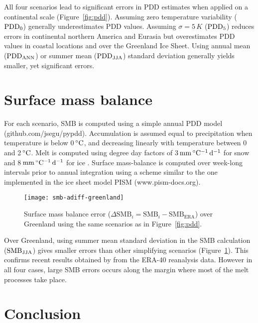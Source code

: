 \documentclass[twocolumn]{igs}
\begin{document}
All four scenarios lead to significant errors in PDD estimates when applied on a continental scale (Figure~\ref{fig:pdd}). Assuming zero temperature variability ($\rm PDD_0$) generally underestimates PDD values. Assuming $\sigma=5\,K$ ($\rm PDD_5$) reduces errors in continental northern America and Eurasia but overestimates PDD values in coastal locations and over the Greenland Ice Sheet. Using annual mean ($\rm PDD_{ANN}$) or summer mean ($\rm PDD_{JJA}$) standard deviation generally yields smaller, yet significant errors.


\section{Surface mass balance}

For each scenario, SMB is computed using a simple annual PDD model (github.com/jsegu/pypdd). Accumulation is assumed equal to precipitation when temperature is below 0\,$\rm^\circ C$, and decreasing linearly with temperature between 0 and 2\,$\rm^\circ C$. Melt is computed using degree day factors of 3\,$\rm mm\,^\circ C^{-1}\,d^{-1}$ for snow and 8\,$\rm mm\,^\circ C^{-1}\,d^{-1}$ for ice \citep{huybrechts-dewolde-1999}. Surface mass-balance is computed over week-long intervals prior to annual integration using a scheme similar to the one implemented in the ice sheet model PISM (www.pism-docs.org).

\begin{figure}
  \centering\texttt{[image: smb-adiff-greenland]}
  \caption{Surface mass balance error ($\Delta\mathrm{SMB}_i = \mathrm{SMB}_i - \mathrm{SMB_{ERA}}$) over Greenland using the same scenarios as in Figure~\ref{fig:pdd}.}
  \label{fig:smb}
\end{figure}

Over Greenland, using summer mean standard deviation in the SMB calculation ($\rm SMB_{JJA}$) gives smaller errors than other simplifying scenarios (Figure~\ref{fig:smb}). This confirms recent results obtained by \citet{rau-rogozhina-2013} from the ERA-40 reanalysis data. However in all four cases, large SMB errors occurs along the margin where most of the melt processes take place.


\section{Conclusion}
\end{document}
